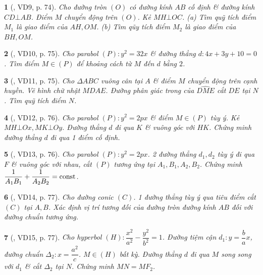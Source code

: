 \documentclass{article}
\newtheorem{baitoan}{}
\begin{document}
\begin{baitoan}[\cite{Hai_Hung_Thu_Tung_ncpt_Toan_10_tap_2}, VD9, p. 74]
	Cho đường tròn $(O)$ có đường kính $AB$ cố định \& đường kính $CD\bot AB$. Điểm $M$ chuyển động trên $(O)$. Kẻ $MH\bot OC$. (a) Tìm quỹ tích điểm $M_1$ là giao điểm của $AH,OM$. (b) Tìm qũy tích điểm $M_2$ là giao điểm của $BH,OM$.
\end{baitoan}

\begin{baitoan}[\cite{Hai_Hung_Thu_Tung_ncpt_Toan_10_tap_2}, VD10, p. 75]
	Cho parabol $(P):y^2 = 32x$ \& đường thẳng $d:4x + 3y + 10 = 0$. Tìm điểm $M\in(P)$ để khoảng cách từ $M$ đến $d$ bằng $2$.
\end{baitoan}

\begin{baitoan}[\cite{Hai_Hung_Thu_Tung_ncpt_Toan_10_tap_2}, VD11, p. 75]
	Cho $\Delta ABC$ vuông cân tại $A$ \& điểm $M$ chuyển động trên cạnh huyền. Vẽ hình chữ nhật $MDAE$. Đường phân giác trong của $\widehat{DME}$ cắt $DE$ tại $N$. Tìm quỹ tích điểm $N$.
\end{baitoan}

\begin{baitoan}[\cite{Hai_Hung_Thu_Tung_ncpt_Toan_10_tap_2}, VD12, p. 76]
	Cho parabol $(P):y^2 = 2px$ \& điểm $M\in(P)$ tùy ý. Kẻ $MH\bot Ox,MK\bot Oy$. Đường thẳng $d$ đi qua $K$ \& vuông góc với $HK$. Chứng minh đường thẳng $d$ đi qua 1 điểm cố định.
\end{baitoan}

\begin{baitoan}[\cite{Hai_Hung_Thu_Tung_ncpt_Toan_10_tap_2}, VD13, p. 76]
	Cho parabol $(P):y^2 = 2px$. 2 đường thẳng $d_1,d_2$ tùy ý đi qua $F$ \& vuông góc với nhau, cắt $(P)$ tương ứng tại $A_1,B_1,A_2,B_2$. Chứng minh $\dfrac{1}{A_1B_1} + \dfrac{1}{A_2B_2} = {\rm const}$.
\end{baitoan}

\begin{baitoan}[\cite{Hai_Hung_Thu_Tung_ncpt_Toan_10_tap_2}, VD14, p. 77]
	Cho đường conic $(C)$. 1 đường thẳng tùy ý qua tiêu điểm cắt $(C)$ tại $A,B$. Xác định vị trí tương đối của đường tròn đường kính $AB$ đối với đường chuẩn tương ứng.
\end{baitoan}

\begin{baitoan}[\cite{Hai_Hung_Thu_Tung_ncpt_Toan_10_tap_2}, VD15, p. 77]
	Cho hyperbol $(H):\dfrac{x^2}{a^2} - \dfrac{y^2}{b^2} = 1$. Đường tiệm cận $d_1:y = \dfrac{b}{a}x$, đường chuẩn $\Delta_2:x = \dfrac{a^2}{c}$. $M\in(H)$ bất kỳ. Đường thẳng $d$ đi qua $M$ song song với $d_1$ \& cắt $\Delta_2$ tại $N$. Chứng minh $MN = MF_2$.
\end{baitoan}
\end{document}
